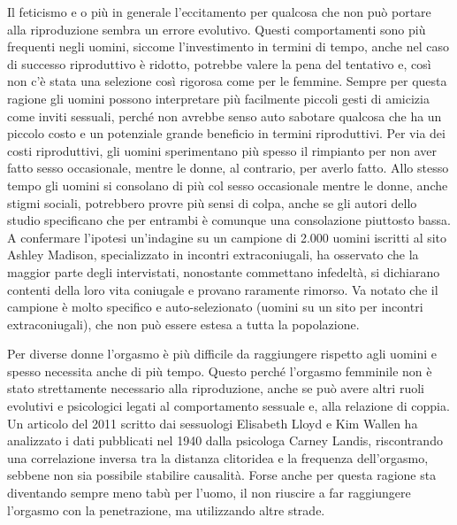 \documentclass[12pt]{book} %
\begin{document}
Il feticismo e o più in generale l'eccitamento per qualcosa che non può portare alla riproduzione sembra un errore evolutivo.
Questi comportamenti sono più frequenti negli uomini, siccome l'investimento in termini di tempo, anche nel caso di successo riproduttivo è ridotto, potrebbe valere la pena del tentativo e, così non c'è stata una selezione così rigorosa come per le femmine. Sempre per questa ragione gli uomini possono interpretare più facilmente piccoli gesti di amicizia come inviti sessuali, perché non avrebbe senso auto sabotare qualcosa che ha un piccolo costo e un potenziale grande beneficio in termini riproduttivi.
Per via dei costi riproduttivi, gli uomini sperimentano più spesso il rimpianto per non aver fatto sesso occasionale, mentre le donne, al contrario, per averlo fatto.
Allo stesso tempo gli uomini si consolano di più col sesso occasionale mentre le donne, anche stigmi sociali, potrebbero provre più sensi di colpa, anche se gli autori dello studio specificano che per entrambi è comunque una consolazione piuttosto bassa. A confermare l'ipotesi un'indagine su un campione di 2.000 uomini iscritti al sito Ashley Madison, specializzato in incontri extraconiugali, ha osservato che la maggior parte degli intervistati, nonostante commettano infedeltà, si dichiarano contenti della loro vita coniugale e provano raramente rimorso. Va notato che il campione è molto specifico e auto-selezionato (uomini su un sito per incontri extraconiugali), che non può essere estesa a tutta la popolazione.

Per diverse donne l'orgasmo è più difficile da raggiungere rispetto agli uomini e spesso necessita anche di più tempo. Questo perché l'orgasmo femminile non
è stato strettamente necessario alla riproduzione, anche se può avere altri ruoli evolutivi e psicologici legati al comportamento sessuale e, alla relazione di coppia. 
Un articolo del 2011 scritto dai sessuologi Elisabeth Lloyd e Kim Wallen ha analizzato i dati pubblicati nel 1940 dalla psicologa Carney Landis, riscontrando una correlazione inversa tra la distanza clitoridea e la frequenza dell’orgasmo, sebbene non sia possibile stabilire causalità. Forse anche per questa ragione sta diventando sempre meno tabù per l'uomo, il non riuscire a far raggiungere l'orgasmo con la penetrazione, ma utilizzando altre strade.
\end{document}
